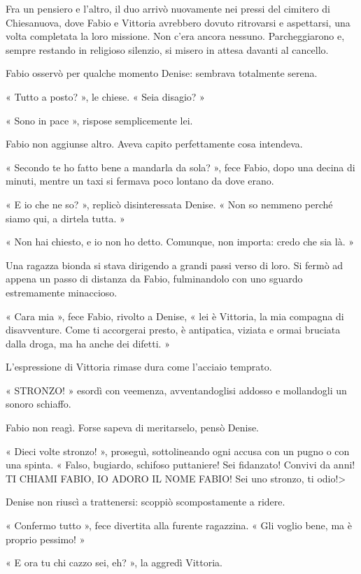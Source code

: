 Fra un pensiero e l'altro, il duo arrivò nuovamente nei pressi del cimitero di Chiesanuova, dove Fabio e Vittoria avrebbero dovuto ritrovarsi e aspettarsi, una volta completata la loro missione. Non c'era ancora nessuno. Parcheggiarono e, sempre restando in religioso silenzio, si misero in attesa davanti al cancello.

Fabio osservò per qualche momento Denise: sembrava totalmente serena.

« Tutto a posto? », le chiese. « Seia disagio? »

« Sono in pace », rispose semplicemente lei.

Fabio non aggiunse altro. Aveva capito perfettamente cosa intendeva.

« Secondo te ho fatto bene a mandarla da sola? », fece Fabio, dopo una decina di minuti, mentre un taxi si fermava poco lontano da dove erano.

« E io che ne so? », replicò disinteressata Denise. « Non so nemmeno perché siamo qui, a dirtela tutta. »

« Non hai chiesto, e io non ho detto. Comunque, non importa: credo che sia là. »

Una ragazza bionda si stava dirigendo a grandi passi verso di loro. Si fermò ad appena un passo di distanza da Fabio, fulminandolo con uno sguardo estremamente minaccioso.

« Cara mia », fece Fabio, rivolto a Denise, « lei è Vittoria, la mia compagna di disavventure. Come ti accorgerai presto, è antipatica, viziata e ormai bruciata dalla droga, ma ha anche dei difetti. »

L'espressione di Vittoria rimase dura come l'acciaio temprato.

« STRONZO! » esordì con veemenza, avventandoglisi addosso e mollandogli un sonoro schiaffo.

Fabio non reagì. Forse sapeva di meritarselo, pensò Denise.

« Dieci volte stronzo! », proseguì, sottolineando ogni accusa con un pugno o con una spinta. « Falso, bugiardo, schifoso puttaniere! Sei fidanzato! Convivi da anni! TI CHIAMI FABIO, IO ADORO IL NOME FABIO! Sei uno stronzo, ti odio!>

Denise non riuscì a trattenersi: scoppiò scompostamente a ridere.

« Confermo tutto », fece divertita alla furente ragazzina. « Gli voglio bene, ma è proprio pessimo! »

« E ora tu chi cazzo sei, eh? », la aggredì Vittoria.


